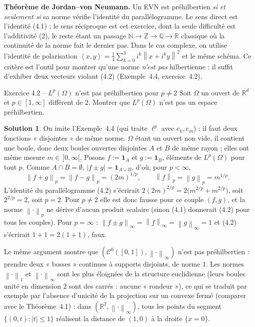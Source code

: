 \documentclass[11pt,a4paper]{article}
\newcommand{\R}{\mathbb{R}}
\newcommand{\N}{\mathbb{N}}
\newcommand{\Z}{\mathbb{Z}}
\newcommand{\Q}{\mathbb{Q}}
\newcommand{\norm}[1]{\left\|#1\right\|}
\newcommand{\Cz}{\mathcal{C}^0}
\newcommand{\ps}[2]{\left\langle #1,#2\right\rangle}
\theoremstyle{definition}
\newtheorem*{solution}{Solution}
\begin{document}
\begin{pointcle}
\textbf{Théorème de Jordan--von Neumann.} Un EVN est préhilbertien \emph{si et seulement si} sa norme vérifie l'identité du parallélogramme. Le sens direct est l'identité (4.1) ; le sens réciproque est cet exercice, dont la seule difficulté est l'additivité (2), le reste étant un passage $\N\to\Z\to\Q\to\R$ classique où la continuité de la norme fait le dernier pas. Dans le cas complexe, on utilise l'identité de polarisation $\ps xy=\frac14\sum_{k=0}^3 i^k\norm{x+i^ky}^2$ et le même schéma. Ce critère est l'outil pour montrer qu'une norme \emph{n'est pas} hilbertienne : il suffit d'exhiber deux vecteurs violant (4.2) (Exemple~4.4, exercice~4.2).
\end{pointcle}

\begin{exo}{Exercice 4.2 -- $L^p(\Omega)$ n'est pas préhilbertien pour $p\neq2$}
Soit $\Omega$ un ouvert de $\R^d$ et $p\in[1,\infty]$ différent de $2$. Montrer que $L^p(\Omega)$ n'est pas un espace préhilbertien.
\end{exo}

\begin{solution}
On imite l'Exemple~4.4 (qui traite $\ell^p$ avec $e_k,e_m$) : il faut deux fonctions « disjointes » de même norme. $\Omega$ étant un ouvert non vide, il contient une boule, donc deux boules ouvertes disjointes $A$ et $B$ de même rayon ; elles ont même mesure $m\in\,]0,\infty[$. Posons $f:=\mathbf 1_A$ et $g:=\mathbf 1_B$, éléments de $L^p(\Omega)$ pour tout $p$. Comme $A\cap B=\emptyset$, $|f\pm g|=\mathbf 1_{A\cup B}$, d'où, pour $p<\infty$,
\[
\norm{f+g}_p=\norm{f-g}_p=(2m)^{1/p},\qquad\norm f_p=\norm g_p=m^{1/p}.
\]
L'identité du parallélogramme (4.2) s'écrirait $2(2m)^{2/p}=2\big(m^{2/p}+m^{2/p}\big)$, soit $2^{2/p}=2$, soit $p=2$. Pour $p\ne2$ elle est donc fausse pour ce couple $(f,g)$, et la norme $\norm\cdot_p$ ne dérive d'aucun produit scalaire (sinon (4.1) donnerait (4.2) pour tous les couples). Pour $p=\infty$ : $\norm{f\pm g}_\infty=\norm f_\infty=\norm g_\infty=1$ et (4.2) s'écrirait $1+1=2(1+1)$, faux.
\end{solution}

\begin{commentaire}
Le même argument montre que $(\Cz([0,1]),\norm\cdot_\infty)$ n'est pas préhilbertien : prendre deux « bosses » continues à supports disjoints, de norme $1$. Les normes $\norm\cdot_1$ et $\norm\cdot_\infty$ sont les plus éloignées de la structure euclidienne (leurs boules unité en dimension $2$ sont des carrés : aucune « rondeur »), ce qui se traduit par exemple par l'absence d'unicité de la projection sur un convexe fermé (comparer avec le Théorème~4.1) : dans $(\R^2,\norm\cdot_\infty)$, tous les points du segment $\{(0,t):|t|\le1\}$ réalisent la distance de $(1,0)$ à la droite $\{x=0\}$.
\end{commentaire}
\end{document}

